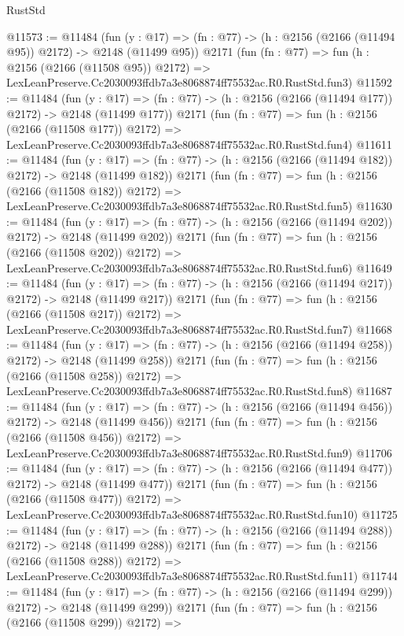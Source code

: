 \begin{lexlean}{RustStd}
\begin{coremodule}
@11573 := @11484
    (fun (y : @17) => (fn : @77) -> (h : @2156 (@2166 (@11494 @95)) @2172) -> @2148 (@11499 @95))
    @2171
    (fun (fn : @77) =>
    fun (h : @2156 (@2166 (@11508 @95)) @2172) =>
    LexLeanPreserve.Cc2030093ffdb7a3e8068874ff75532ac.R0.RustStd.fun3)
@11592 := @11484
    (fun (y : @17) => (fn : @77) -> (h : @2156 (@2166 (@11494 @177)) @2172) -> @2148 (@11499 @177))
    @2171
    (fun (fn : @77) =>
    fun (h : @2156 (@2166 (@11508 @177)) @2172) =>
    LexLeanPreserve.Cc2030093ffdb7a3e8068874ff75532ac.R0.RustStd.fun4)
@11611 := @11484
    (fun (y : @17) => (fn : @77) -> (h : @2156 (@2166 (@11494 @182)) @2172) -> @2148 (@11499 @182))
    @2171
    (fun (fn : @77) =>
    fun (h : @2156 (@2166 (@11508 @182)) @2172) =>
    LexLeanPreserve.Cc2030093ffdb7a3e8068874ff75532ac.R0.RustStd.fun5)
@11630 := @11484
    (fun (y : @17) => (fn : @77) -> (h : @2156 (@2166 (@11494 @202)) @2172) -> @2148 (@11499 @202))
    @2171
    (fun (fn : @77) =>
    fun (h : @2156 (@2166 (@11508 @202)) @2172) =>
    LexLeanPreserve.Cc2030093ffdb7a3e8068874ff75532ac.R0.RustStd.fun6)
@11649 := @11484
    (fun (y : @17) => (fn : @77) -> (h : @2156 (@2166 (@11494 @217)) @2172) -> @2148 (@11499 @217))
    @2171
    (fun (fn : @77) =>
    fun (h : @2156 (@2166 (@11508 @217)) @2172) =>
    LexLeanPreserve.Cc2030093ffdb7a3e8068874ff75532ac.R0.RustStd.fun7)
@11668 := @11484
    (fun (y : @17) => (fn : @77) -> (h : @2156 (@2166 (@11494 @258)) @2172) -> @2148 (@11499 @258))
    @2171
    (fun (fn : @77) =>
    fun (h : @2156 (@2166 (@11508 @258)) @2172) =>
    LexLeanPreserve.Cc2030093ffdb7a3e8068874ff75532ac.R0.RustStd.fun8)
@11687 := @11484
    (fun (y : @17) => (fn : @77) -> (h : @2156 (@2166 (@11494 @456)) @2172) -> @2148 (@11499 @456))
    @2171
    (fun (fn : @77) =>
    fun (h : @2156 (@2166 (@11508 @456)) @2172) =>
    LexLeanPreserve.Cc2030093ffdb7a3e8068874ff75532ac.R0.RustStd.fun9)
@11706 := @11484
    (fun (y : @17) => (fn : @77) -> (h : @2156 (@2166 (@11494 @477)) @2172) -> @2148 (@11499 @477))
    @2171
    (fun (fn : @77) =>
    fun (h : @2156 (@2166 (@11508 @477)) @2172) =>
    LexLeanPreserve.Cc2030093ffdb7a3e8068874ff75532ac.R0.RustStd.fun10)
@11725 := @11484
    (fun (y : @17) => (fn : @77) -> (h : @2156 (@2166 (@11494 @288)) @2172) -> @2148 (@11499 @288))
    @2171
    (fun (fn : @77) =>
    fun (h : @2156 (@2166 (@11508 @288)) @2172) =>
    LexLeanPreserve.Cc2030093ffdb7a3e8068874ff75532ac.R0.RustStd.fun11)
@11744 := @11484
    (fun (y : @17) => (fn : @77) -> (h : @2156 (@2166 (@11494 @299)) @2172) -> @2148 (@11499 @299))
    @2171
    (fun (fn : @77) =>
    fun (h : @2156 (@2166 (@11508 @299)) @2172) =>

\end{coremodule}
\end{lexlean}

